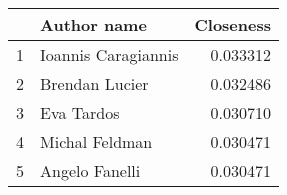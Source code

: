 \begin{tabular}{llr}
\toprule
{} &          Author name &  Closeness \\
\midrule
1 &  Ioannis Caragiannis &   0.033312 \\
2 &       Brendan Lucier &   0.032486 \\
3 &           Eva Tardos &   0.030710 \\
4 &       Michal Feldman &   0.030471 \\
5 &       Angelo Fanelli &   0.030471 \\
\bottomrule
\end{tabular}
